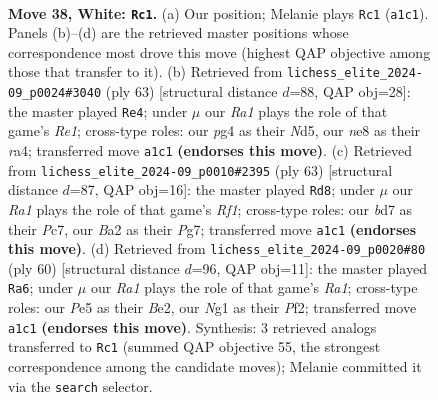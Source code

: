 \documentclass[11pt]{article}
\begin{document}
\clearpage

\begin{figure}[p]\centering
\begin{subfigure}{0.46\textwidth}\centering
\resizebox{\linewidth}{!}{%
\newchessgame
\chessboard[
  setfen={3qn3/3b2k1/p4p1r/n3P2p/PQ1P2p1/N7/B4PPP/R3K1N1 w - - 1 38},
  showmover=false,
  pgfstyle=straightmove, color=movearrow, markmove={a1-c1}
]}
\caption{}
\end{subfigure}\hfill
\begin{subfigure}{0.46\textwidth}\centering
\resizebox{\linewidth}{!}{%
\newchessgame
\chessboard[
  setfen={2b1r1k1/8/p1p3qp/3n2pN/RP3p2/7P/1P1B1PP1/3Q2K1 b - - 2 32},
  showmover=false,
  pgfstyle=straightmove, color=movearrow, markmove={e8-e4}
]}
\caption{}
\end{subfigure}
\\[4pt]
\begin{subfigure}{0.46\textwidth}\centering
\resizebox{\linewidth}{!}{%
\newchessgame
\chessboard[
  setfen={1k3r2/p1p1q1pp/4b3/pPn1P3/2B1p3/2Q4P/1N1R1PP1/6K1 b - - 0 32},
  showmover=false,
  pgfstyle=straightmove, color=movearrow, markmove={f8-d8}
]}
\caption{}
\end{subfigure}\hfill
\begin{subfigure}{0.46\textwidth}\centering
\resizebox{\linewidth}{!}{%
\newchessgame
\chessboard[
  setfen={2r3k1/4qp2/2p1nbpp/1p2p3/1P2P3/1QP2NP1/4BPP1/R5K1 w - - 2 31},
  showmover=false,
  pgfstyle=straightmove, color=movearrow, markmove={a1-a6}
]}
\caption{}
\end{subfigure}
\caption{\textbf{Move 38, White: \texttt{Rc1}.} (a) Our position; Melanie plays \texttt{Rc1} (\texttt{a1c1}). Panels (b)--(d) are the retrieved master positions whose correspondence most drove this move (highest QAP objective among those that transfer to it). (b) Retrieved from \texttt{lichess\_elite\_2024-09\_p0024\#3040} (ply 63) [structural distance $d$=88, QAP obj=28]: the master played \texttt{Re4}; under $\mu$ our \emph{Ra1} plays the role of that game's \emph{Re1}; cross-type roles: our \emph{p}g4 as their \emph{N}d5, our \emph{n}e8 as their \emph{r}a4; transferred move \texttt{a1c1} \textbf{(endorses this move)}. (c) Retrieved from \texttt{lichess\_elite\_2024-09\_p0010\#2395} (ply 63) [structural distance $d$=87, QAP obj=16]: the master played \texttt{Rd8}; under $\mu$ our \emph{Ra1} plays the role of that game's \emph{Rf1}; cross-type roles: our \emph{b}d7 as their \emph{P}c7, our \emph{B}a2 as their \emph{P}g7; transferred move \texttt{a1c1} \textbf{(endorses this move)}. (d) Retrieved from \texttt{lichess\_elite\_2024-09\_p0020\#80} (ply 60) [structural distance $d$=96, QAP obj=11]: the master played \texttt{Ra6}; under $\mu$ our \emph{Ra1} plays the role of that game's \emph{Ra1}; cross-type roles: our \emph{P}e5 as their \emph{B}e2, our \emph{N}g1 as their \emph{P}f2; transferred move \texttt{a1c1} \textbf{(endorses this move)}. Synthesis: 3 retrieved analogs transferred to \texttt{Rc1} (summed QAP objective 55, the strongest correspondence among the candidate moves); Melanie committed it via the \texttt{search} selector.}
\label{fig:thought-m74}
\end{figure}
\end{document}
